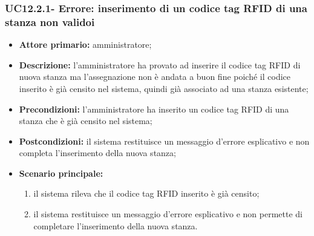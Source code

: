 \subsubsection{UC12.2.1- Errore: inserimento di un codice tag RFID di una stanza non validoi}
\begin{itemize}
	\item \textbf{Attore primario:} amministratore;
	\item \textbf{Descrizione:} l'amministratore ha provato ad inserire il codice tag RFID di nuova stanza ma l'assegnazione non è andata a buon fine poiché il codice inserito è già censito nel sistema, quindi già associato ad una stanza esistente;
	\item \textbf{Precondizioni:} l'amministratore ha inserito un codice tag RFID di una stanza che è già censito nel sistema;
	\item \textbf{Postcondizioni:} il sistema restituisce un messaggio d'errore esplicativo e non completa l'inserimento della nuova stanza;
	\item \textbf{Scenario principale:}
	      \begin{enumerate}
		      \item il sistema rileva che il codice tag RFID inserito è già censito; 
		      \item il sistema restituisce un messaggio d'errore esplicativo e non permette di completare l'inserimento della nuova stanza.
	      \end{enumerate}
\end{itemize}

